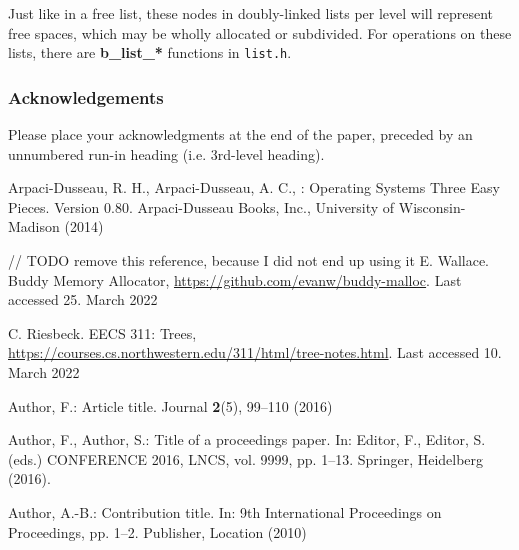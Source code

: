 \documentclass[runningheads]{llncs}
\begin{document}
Just like in a free list, these nodes in doubly-linked lists per level will 
represent free spaces, which may be wholly allocated or subdivided.
For operations on these lists, there are \textbf{b\_list\_*} functions in 
\texttt{list.h}.

\subsubsection{Acknowledgements} Please place your acknowledgments at
the end of the paper, preceded by an unnumbered run-in heading (i.e.
3rd-level heading).

%
%

 
\newpage

\begin{thebibliography}{8}

Arpaci-Dusseau, R. H., Arpaci-Dusseau, A. C., : Operating Systems Three Easy Pieces. Version 0.80. Arpaci-Dusseau Books, Inc.,
University of Wisconsin-Madison (2014)


// TODO remove this reference, because I did not end up using it
E. Wallace. Buddy Memory Allocator, \url{https://github.com/evanw/buddy-malloc}. Last accessed 25.
March 2022

C. Riesbeck. EECS 311: Trees, \url{https://courses.cs.northwestern.edu/311/html/tree-notes.html}. Last accessed 10. March 2022

Author, F.: Article title. Journal \textbf{2}(5), 99--110 (2016)

Author, F., Author, S.: Title of a proceedings paper. In: Editor,
F., Editor, S. (eds.) CONFERENCE 2016, LNCS, vol. 9999, pp. 1--13.
Springer, Heidelberg (2016). 

Author, A.-B.: Contribution title. In: 9th International Proceedings
on Proceedings, pp. 1--2. Publisher, Location (2010)
\end{thebibliography}
\end{document}
